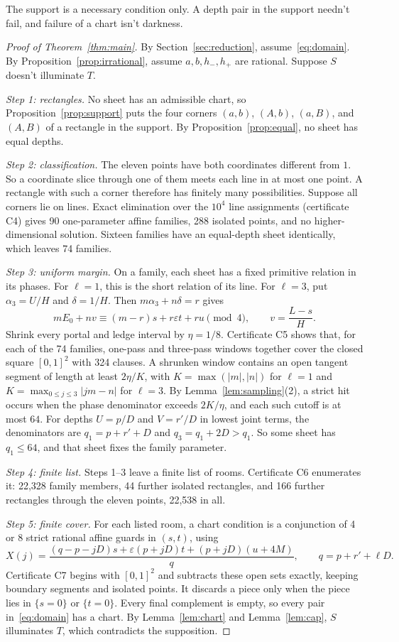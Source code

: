 \documentclass[11pt]{article}
\theoremstyle{remark}
\begin{document}
The support is a necessary condition only. A depth pair in the support needn't fail, and failure of a chart isn't darkness.

\begin{proof}[Proof of Theorem~\ref{thm:main}]
By Section~\ref{sec:reduction}, assume~\eqref{eq:domain}. By Proposition~\ref{prop:irrational}, assume $a,b,h_-,h_+$ are rational. Suppose $S$ doesn't illuminate $T$.

\emph{Step 1: rectangles.} No sheet has an admissible chart, so Proposition~\ref{prop:support} puts the four corners $(a,b)$, $(A,b)$, $(a,B)$, and $(A,B)$ of a rectangle in the support. By Proposition~\ref{prop:equal}, no sheet has equal depths.

\emph{Step 2: classification.} The eleven points have both coordinates different from $1$. So a coordinate slice through one of them meets each line in at most one point. A rectangle with such a corner therefore has finitely many possibilities. Suppose all corners lie on lines. Exact elimination over the $10^4$ line assignments (certificate C4) gives 90 one-parameter affine families, 288 isolated points, and no higher-dimensional solution. Sixteen families have an equal-depth sheet identically, which leaves 74 families.

\emph{Step 3: uniform margin.} On a family, each sheet has a fixed primitive relation in its phases. For $\ell=1$, this is the short relation of its line. For $\ell=3$, put $\alpha_3=U/H$ and $\delta=1/H$. Then $m\alpha_3+n\delta=r$ gives
\[
mE_0+nv\equiv(m-r)s+r\varepsilon t+ru\pmod 4,\qquad v=\frac{L-s}{H}.
\]
Shrink every portal and ledge interval by $\eta=1/8$. Certificate C5 shows that, for each of the 74 families, one-pass and three-pass windows together cover the closed square $[0,1]^2$ with 324 clauses. A shrunken window contains an open tangent segment of length at least $2\eta/K$, with $K=\max(|m|,|n|)$ for $\ell=1$ and $K=\max_{0\le j\le3}|jm-n|$ for $\ell=3$. By Lemma~\ref{lem:sampling}(2), a strict hit occurs when the phase denominator exceeds $2K/\eta$, and each such cutoff is at most $64$. For depths $U=p/D$ and $V=r'/D$ in lowest joint terms, the denominators are $q_1=p+r'+D$ and $q_3=q_1+2D>q_1$. So some sheet has $q_1\le64$, and that sheet fixes the family parameter.

\emph{Step 4: finite list.} Steps 1--3 leave a finite list of rooms. Certificate C6 enumerates it: 22{,}328 family members, 44 further isolated rectangles, and 166 further rectangles through the eleven points, 22{,}538 in all.

\emph{Step 5: finite cover.} For each listed room, a chart condition is a conjunction of 4 or 8 strict rational affine guards in $(s,t)$, using
\[
X(j)=\frac{(q-p-jD)s+\varepsilon(p+jD)t+(p+jD)(u+4M)}{q},\qquad q=p+r'+\ell D.
\]
Certificate C7 begins with $[0,1]^2$ and subtracts these open sets exactly, keeping boundary segments and isolated points. It discards a piece only when the piece lies in $\{s=0\}$ or $\{t=0\}$. Every final complement is empty, so every pair in~\eqref{eq:domain} has a chart. By Lemma~\ref{lem:chart} and Lemma~\ref{lem:cap}, $S$ illuminates $T$, which contradicts the supposition.
\end{proof}
\end{document}
